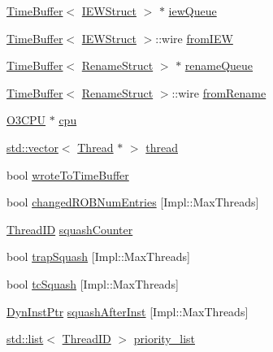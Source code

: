 \begin{DoxyCompactItemize}
\item 
\hyperlink{classTimeBuffer}{TimeBuffer}$<$ \hyperlink{classDefaultCommit_a7cf3f052f760b3a8a18623f792c10910}{IEWStruct} $>$ $\ast$ \hyperlink{classDefaultCommit_a034b0868914c304e81c13c4e645d2616}{iewQueue}
\item 
\hyperlink{classTimeBuffer}{TimeBuffer}$<$ \hyperlink{classDefaultCommit_a7cf3f052f760b3a8a18623f792c10910}{IEWStruct} $>$::wire \hyperlink{classDefaultCommit_a7968756e9e478ff69e80117ffbea4e46}{fromIEW}
\item 
\hyperlink{classTimeBuffer}{TimeBuffer}$<$ \hyperlink{classDefaultCommit_a0c2a89ad2edad9ad605d0461f9b132a5}{RenameStruct} $>$ $\ast$ \hyperlink{classDefaultCommit_ae9b536282159ba75153a223be77515ba}{renameQueue}
\item 
\hyperlink{classTimeBuffer}{TimeBuffer}$<$ \hyperlink{classDefaultCommit_a0c2a89ad2edad9ad605d0461f9b132a5}{RenameStruct} $>$::wire \hyperlink{classDefaultCommit_a2b6b1d4785b92bd378f8a7abc5b7e6b9}{fromRename}
\item 
\hyperlink{classDefaultCommit_a44622cf06940413482836cb62931ac3f}{O3CPU} $\ast$ \hyperlink{classDefaultCommit_a1379cf882a12ac6fc9eba5da7c84b18b}{cpu}
\item 
\hyperlink{classstd_1_1vector}{std::vector}$<$ \hyperlink{structO3ThreadState}{Thread} $\ast$ $>$ \hyperlink{classDefaultCommit_afe9da004c5a3f37cbb72fa3763d4c0d1}{thread}
\item 
bool \hyperlink{classDefaultCommit_a2c7e870d4babdac0dc91fc7ffabd0f3d}{wroteToTimeBuffer}
\item 
bool \hyperlink{classDefaultCommit_a0d55e69b2ac22e8956d569bcf49e374b}{changedROBNumEntries} \mbox{[}Impl::MaxThreads\mbox{]}
\item 
\hyperlink{base_2types_8hh_ab39b1a4f9dad884694c7a74ed69e6a6b}{ThreadID} \hyperlink{classDefaultCommit_a06341c2bebd8c862e411e474e01c9c1a}{squashCounter}
\item 
bool \hyperlink{classDefaultCommit_af3547420a792f13034730b5f327a47ff}{trapSquash} \mbox{[}Impl::MaxThreads\mbox{]}
\item 
bool \hyperlink{classDefaultCommit_a4fce523b7a931003efb9665605a87ca0}{tcSquash} \mbox{[}Impl::MaxThreads\mbox{]}
\item 
\hyperlink{classDefaultCommit_a028ce10889c5f6450239d9e9a7347976}{DynInstPtr} \hyperlink{classDefaultCommit_af0c3f70b9be736dfd854ea22a0131e1c}{squashAfterInst} \mbox{[}Impl::MaxThreads\mbox{]}
\item 
\hyperlink{classstd_1_1list}{std::list}$<$ \hyperlink{base_2types_8hh_ab39b1a4f9dad884694c7a74ed69e6a6b}{ThreadID} $>$ \hyperlink{classDefaultCommit_a4d358db7156d04e20b3269a53334dd19}{priority\_\-list}

\end{DoxyCompactItemize}
